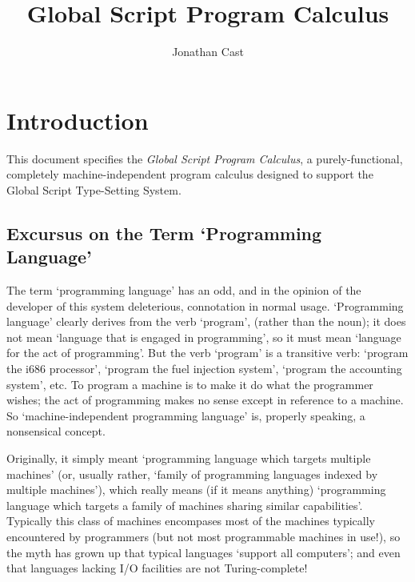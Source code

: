 \documentclass{report}
\title{Global Script Program Calculus}
\author{Jonathan Cast}
\newcommand\defn[1]{\emph{#1}}
\begin{document}
\maketitle

\tableofcontents

\chapter{Introduction}

This document specifies the \defn{Global Script Program Calculus}, a purely-functional, completely machine-independent program calculus designed to support the Global Script Type-Setting System.

\section{Excursus on the Term `Programming Language'}

The term `programming language' has an odd, and in the opinion of the developer of this system deleterious, connotation in normal usage.
`Programming language' clearly derives from the verb `program', (rather than the noun);
it does not mean `language that is engaged in programming', so it must mean `language for the act of programming'.
But the verb `program' is a transitive verb: `program the i686 processor', `program the fuel injection system', `program the accounting system', etc.
To program a machine is to make it do what the programmer wishes;
the act of programming makes no sense except in reference to a machine.
So `machine-independent programming language' is, properly speaking, a nonsensical concept.

Originally, it simply meant `programming language which targets multiple machines'
(or, usually rather, `family of programming languages indexed by multiple machines'),
which really means (if it means anything) `programming language which targets a family of machines sharing similar capabilities'.
Typically this class of machines encompases most of the machines typically encountered by programmers
(but not most programmable machines in use!),
so the myth has grown up that typical languages `support all computers';
and even that languages lacking I/O facilities are not Turing-complete!
\end{document}
